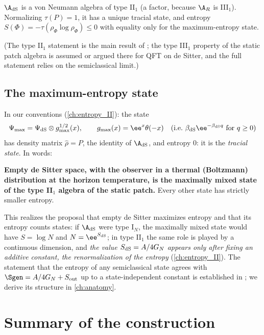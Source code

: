 \begin{theorem}[CLPW]
$\A_{\rm dS}$ is a von Neumann algebra of type II$_1$ (a factor, because $\A_R$ is III$_1$). Normalizing $\tau(P)=1$, it has a unique tracial state, and entropy $S(\Phi)=-\tau(\rho_\Phi\log\rho_\Phi)\le0$ with equality only for the maximum-entropy state.
\end{theorem}
(The type II$_1$ statement is the main result of \cite{CLPW2023}; the type III$_1$ property of the static patch algebra is assumed or argued there for QFT on de Sitter, and the full statement relies on the semiclassical limit.)

\subsection*{The maximum-entropy state}
In our conventions (\cref{ch:entropy_II}): the state
\begin{equation}
\Psi_{\max}=\Psi_{\rm dS}\otimes g_{\max}^{1/2}(x),\qquad g_{\max}(x)=\ee^{x}\theta(-x)\quad(\text{i.e.}\ \beta_{\rm dS}\ee^{-\beta_{\rm dS}q}\ \text{for}\ q\ge0)
\end{equation}
has density matrix $\hat\rho=P$, the identity of $\A_{\rm dS}$, and entropy $0$: it is the \emph{tracial state}. In words:

\begin{keyidea}
\textbf{Empty de Sitter space, with the observer in a thermal (Boltzmann) distribution at the horizon temperature, is the maximally mixed state of the type II$_1$ algebra of the static patch.} Every other state has strictly smaller entropy.
\end{keyidea}

This realizes the proposal that empty de Sitter maximizes entropy and that its entropy counts states: if $\A_{\rm dS}$ were type I$_N$, the maximally mixed state would have $S=\log N$ and $N=\ee^{S_{\rm dS}}$; in type II$_1$ the same role is played by a continuous dimension, and \emph{the value $S_{\rm dS}=A/4G_N$ appears only after fixing an additive constant, the renormalization of the entropy} (\cref{ch:entropy_II}). The statement that the entropy of any semiclassical state agrees with $\Sgen=A/4G_N+S_{\rm out}$ up to a state-independent constant is established in \cite{CLPW2023}; we derive its structure in \cref{ch:anatomy}.

\section{Summary of the construction}

